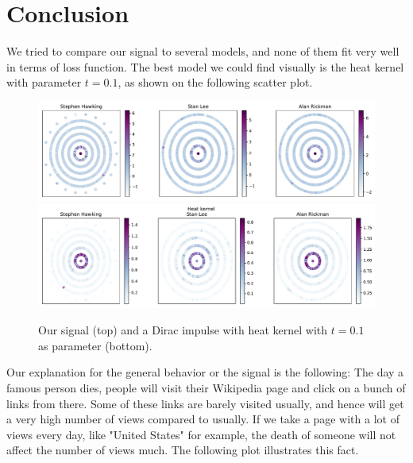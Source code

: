 \documentclass[conference]{IEEEtran}
\begin{document}
\section{Conclusion} \label{conclusion}

We tried to compare our signal to several models, and none of them fit very well in terms of loss function. The best model we could find visually is the heat kernel with parameter $t=0.1$, as shown on the following scatter plot. 

\begin{figure}[!htb]
\includegraphics[width=\linewidth]{signal_scatter.pdf}
\includegraphics[width=\linewidth]{heat_scatter.pdf}
\caption{Our signal (top) and a Dirac impulse with heat kernel  with $t=0.1$ as parameter (bottom).} 
\end{figure}

Our explanation for the general behavior or the signal is the following: 
\newline
The day a famous person dies, people will visit their Wikipedia page and click on a bunch of links from there. Some of these links are barely visited usually, and hence will get a very high number of views compared to usually. If we take a page with a lot of views every day, like "United States" for example, the death of someone will not affect the number of views much. The following plot illustrates this fact. 
\end{document}
